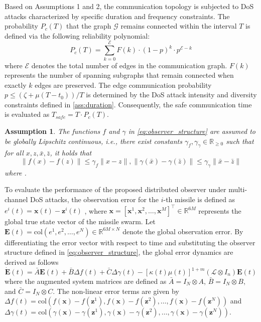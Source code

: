 \documentclass[lettersize,journal]{IEEEtran}
\newtheorem{assumption}{Assumption}
\begin{document}
Based on Assumptions 1 and 2, the communication topology is subjected to DoS attacks characterized by specific duration and frequency constraints. The probability $P_c(T)$ that the graph $\mathcal{G}$ remains connected within the interval $T$ is defined via the following reliability polynomial:
\begin{equation}
	P_c(T) = \sum_{k=0}^{\mathcal{E}} F(k) \cdot (1-p)^k \cdot p^{\mathcal{E}-k}
\end{equation}
where $\mathcal{E}$ denotes the total number of edges in the communication graph. $F(k)$ represents the number of spanning subgraphs that remain connected when exactly $k$ edges are preserved. The edge communication probability $p \leq ({\zeta + \mu(T-t_0)})/{T}$ is determined by the DoS attack intensity and diversity constraints defined in \eqref{ass:duration}. Consequently, the safe communication time is evaluated as $T_{safe} = T \cdot P_c(T)$.


\begin{assumption}
	\label{ass:Lipschitz}
	The functions $f$ and $\gamma$ in \eqref{eq:observer_structure} are assumed to be globally Lipschitz continuous, i.e., there exist constants $\gamma_f, \gamma_\gamma \in \mathbb{R}_{ \ge 0}$ such that for all $x, z, \bar{x}, \bar{z}$, it holds that
	\begin{equation}
		\| f(x) - f(z) \| \le \gamma_f \| x - z \|,\| \gamma(\bar{x}) - \gamma(\bar{z}) \| \le \gamma_\gamma \| \bar{x} - \bar{z} \|
	\end{equation}
	where .
\end{assumption}

To evaluate the performance of the proposed distributed observer under multi-channel DoS attacks, the observation error for the $i$-th missile is defined as $e^i(t) = \mathbf{x}(t) - \mathbf{z}^i(t)$ , where $\mathbf{x} = [\mathbf{x}^1, \mathbf{x}^2, \dots, \mathbf{x}^M]^\top \in \mathbb{R}^{6M}$ represents the global true state vector of the missile swarm. Let $\mathbf{E}(t) = \text{col}(e^1, e^2, \dots, e^N) \in \mathbb{R}^{6M \times N}$ denote the global observation error. By differentiating the error vector with respect to time and substituting the observer structure defined in \eqref{eq:observer_structure}, the global error dynamics are derived as follows
\begin{equation}
	\label{E}
	\dot{\mathbf{E}}(t) = \bar{A}\mathbf{E}(t) + \bar{B}\Delta f(t) + \bar{C}\Delta \gamma(t) - [\kappa(t)\mu(t)]^{1+m} (\mathcal{L} \otimes I_n)\mathbf{E}(t) 
\end{equation}
where the augmented system matrices are defined as $\bar{A} = I_N \otimes A$, $\bar{B} = I_N \otimes B$, and $\bar{C} = I_N \otimes C$. The non-linear error terms are given by $\Delta f(t) = \text{col}(f(\mathbf{x}) - f(\mathbf{z}^1), f(\mathbf{x}) - f(\mathbf{z}^2), \dots, f(\mathbf{x}) - f(\mathbf{z}^N))$ and $\Delta \gamma(t) = \text{col}(\gamma(\mathbf{x}) - \gamma({\mathbf{z}}^1), \gamma(\mathbf{x}) - \gamma({\mathbf{z}}^2), \dots, \gamma(\mathbf{x}) - \gamma({\mathbf{z}}^N))$.
\end{document}
